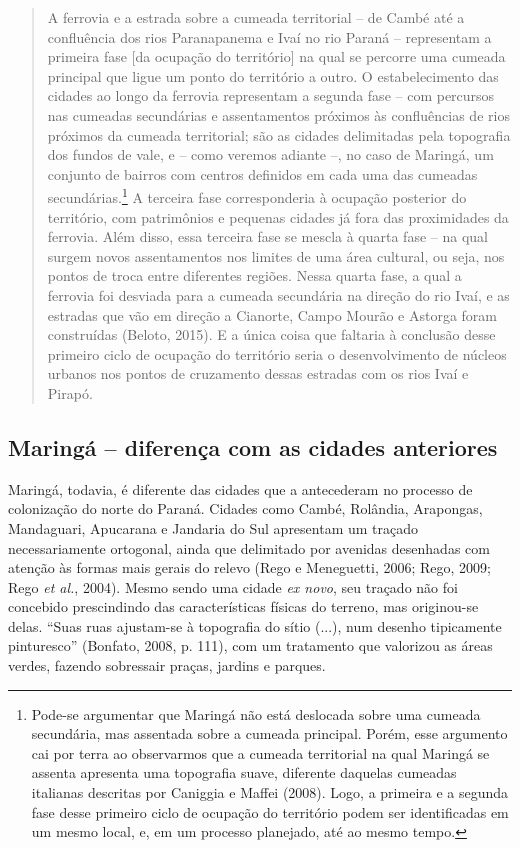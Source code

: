 \documentclass[12pt, a4paper]{book} %
\begin{document}
        \begin{quotation}
            A ferrovia e a estrada sobre a cumeada territorial – de Cambé até a confluência dos rios Paranapanema e Ivaí no rio Paraná – representam a primeira fase [da ocupação do território] na qual se percorre uma cumeada principal que ligue um ponto do território a outro. O estabelecimento das cidades ao longo da ferrovia representam a segunda fase – com percursos nas cumeadas secundárias e assentamentos próximos às confluências de rios próximos da cumeada territorial; são as cidades delimitadas pela topografia dos fundos de vale, e – como veremos adiante –, no caso de Maringá, um conjunto de bairros com centros definidos em cada uma das cumeadas secundárias.\footnote[95]{Pode-se argumentar que Maringá não está deslocada sobre uma cumeada secundária, mas assentada sobre a cumeada principal. Porém, esse argumento cai por terra ao observarmos que a cumeada territorial na qual Maringá se assenta apresenta uma topografia suave, diferente daquelas cumeadas italianas descritas por Caniggia e Maffei (2008). Logo, a primeira e a segunda fase desse primeiro ciclo de ocupação do território podem ser identificadas em um mesmo local, e, em um processo planejado, até ao mesmo tempo.} A terceira fase corresponderia à ocupação posterior do território, com patrimônios e pequenas cidades já fora das proximidades da ferrovia. Além disso, essa terceira fase se mescla à quarta fase – na qual surgem novos assentamentos nos limites de uma área cultural, ou seja, nos pontos de troca entre diferentes regiões. Nessa quarta fase, a qual a ferrovia foi desviada para a cumeada secundária na direção do rio Ivaí, e as estradas que vão em direção a Cianorte, Campo Mourão e Astorga foram construídas (Beloto, 2015). E a única coisa que faltaria à conclusão desse primeiro ciclo de ocupação do território seria o desenvolvimento de núcleos urbanos nos pontos de cruzamento dessas estradas com os rios Ivaí e Pirapó.
        \end{quotation}

                \subsection*{Maringá – diferença com as cidades anteriores}

        
        Maringá, todavia, é diferente das cidades que a antecederam no processo de colonização do norte do Paraná. Cidades como Cambé, Rolândia, Arapongas, Mandaguari, Apucarana e Jandaria do Sul apresentam um traçado necessariamente ortogonal, ainda que delimitado por avenidas desenhadas com atenção às formas mais gerais do relevo (Rego e Meneguetti, 2006; Rego, 2009; Rego \textit{et al.}, 2004). Mesmo sendo uma cidade \textit{ex novo}, seu traçado não foi concebido prescindindo das características físicas do terreno, mas originou-se delas. ``Suas ruas ajustam-se à topografia do sítio (...), num desenho tipicamente pinturesco'' (Bonfato, 2008, p. 111), com um tratamento que valorizou as áreas verdes, fazendo sobressair praças, jardins e parques. 
        
\end{document}
